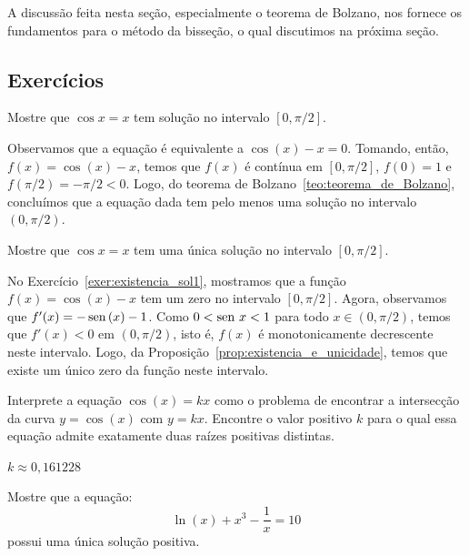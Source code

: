 A discussão feita nesta seção, especialmente o teorema de Bolzano, nos fornece os fundamentos para o método da bisseção, o qual discutimos na próxima seção.

\subsection*{Exercícios}
\begin{exer}\label{exer:existencia_sol1}
  Mostre que $\cos x = x$ tem solução no intervalo $[0, \pi/2]$.
\end{exer}
\begin{resp}
  
  Observamos que a equação é equivalente a $\cos(x) - x = 0$. Tomando, então, $f(x) = \cos(x) - x$, temos que $f(x)$ é contínua em $[0, \pi/2]$, $f(0) = 1$ e $f(\pi/2) = -\pi/2 < 0$. Logo, do teorema de Bolzano~\ref{teo:teorema_de_Bolzano}, concluímos que a equação dada tem pelo menos uma solução no intervalo $(0, \pi/2)$.    
  
\end{resp}

\begin{exer}
  Mostre que $\cos x = x$ tem uma única solução no intervalo $[0, \pi/2]$.
\end{exer}
\begin{resp}
  
    No Exercício~\ref{exer:existencia_sol1}, mostramos que a função $f(x) = \cos(x) - x$ tem um zero no intervalo $[0, \pi/2]$. Agora, observamos que $f'(x) = -\operatorname{sen}\,(x) - 1$. Como $0 < \operatorname{sen}\, x < 1$ para todo $x\in (0, \pi/2)$, temos que $f'(x) < 0$ em $(0, \pi/2)$, isto é, $f(x)$ é monotonicamente decrescente neste intervalo. Logo, da Proposição~\ref{prop:existencia_e_unicidade}, temos que existe um único zero da função neste intervalo.
  
\end{resp}

\begin{exer} Interprete a equação $\cos(x)=kx$ como o problema de encontrar a intersecção da curva $y=\cos(x)$ com $y=kx$. Encontre o valor positivo $k$ para o qual essa equação admite exatamente duas raízes positivas distintas.
\end{exer}
\begin{resp}
  
    $k\approx 0,161228$
  
\end{resp}


\begin{exer}Mostre que a equação:
  \begin{equation*}
    \ln(x)+x^3-\frac{1}{x}=10  
  \end{equation*}
possui uma única solução positiva.
\end{exer}

